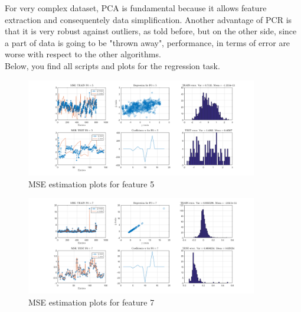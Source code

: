 \documentclass{article}
\begin{document}
For very complex dataset, PCA is fundamental because it allows feature extraction and consequentely data simplification. Another advantage of PCR is that it is very robust against outliers, as told before, but on the other side, since a part of data is going to be "thrown away", performance, in terms of error are worse with respect to the other algorithms. \\
Below, you find all scripts and plots for the regression task.

\label{lst: UPDRS analysis - Main}
\label{lst: Data cleaning function}
\label{lst: Data normalization function}
\label{lst: MSE coefficients}
\label{lst: Plot function}

\begin{figure}[H]
	\centering
	\includegraphics[width=0.9\textwidth]{pictures/MSE_F5_FINAL.png}
	\caption{MSE estimation plots for feature 5}\label{fig:MSE_F5_FINAL}
\end{figure}

\begin{figure}[H]
	\centering
	\includegraphics[width=0.9\textwidth]{pictures/MSE_F7_FINAL.png}
	\caption{MSE estimation plots for feature 7}\label{fig:MSE_F7_FINAL}
\end{figure}
\end{document}
